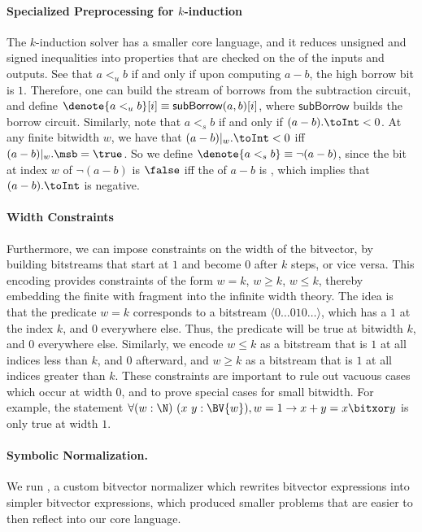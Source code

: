 \paragraph{Specialized Preprocessing for $k$-induction}
The $k$-induction solver has a smaller core language, and it reduces unsigned and signed inequalities
into properties that are checked on the \msb{} of the inputs and outputs.
See that $a <_u b$ if and only if upon computing $a - b$, the high borrow bit
is $1$. Therefore, one can build the stream of borrows from the subtraction circuit,
and define $\denote{a <_u b}[i] \equiv \mathsf{subBorrow}(a, b)[i]$, where $\mathsf{subBorrow}$
builds the borrow circuit. Similarly, note that $a <_s b$ if and only if $(a - b).\toInt < 0$.
At any finite bitwidth $w$, we have that $(a - b)|_w.\toInt < 0$ iff $(a - b)|_w.\msb = \true$.
So we define $\denote{a <_s b} \equiv \lnot (a - b)$, since the bit at index $w$  of $\lnot (a - b)$ is $\false$
iff the \msb of $a - b$ is \true, which implies that $(a - b).\toInt$ is negative.

\paragraph{Width Constraints}
Furthermore, we can impose constraints on the width of the bitvector,
by building bitstreams that start at $1$ and become $0$ after $k$ steps, or vice versa.
This encoding provides constraints of the form $w = k$, $w \geq k$, $w \leq k$,
thereby embedding the finite with fragment into the infinite width theory.
The idea is that the predicate $w = k$ corresponds to a bitstream $\langle0\dots010\dots\rangle$,
which has a $1$ at the index $k$, and $0$ everywhere else. Thus, the predicate
will be true at bitwidth $k$, and $0$ everywhere else.
Similarly, we encode $w \leq k$ as a bitstream that is $1$ at all indices less than $k$,
and $0$ afterward, and $w \geq k$ as a bitstream that is $1$ at all indices greater than $k$.
These constraints are important to rule out vacuous cases which occur at width $0$,
and to prove special cases for small bitwidth.
For example, the statement $\forall (w : \N)~(x~y : \BV{w}), w = 1 \to x + y = x \bitxor y$
is only true at width $1$.

\paragraph{Symbolic Normalization.} We run \bvnormalize{}, a custom bitvector
normalizer which rewrites bitvector expressions into simpler bitvector expressions,
which produced smaller problems that are easier to then reflect into our core language.

